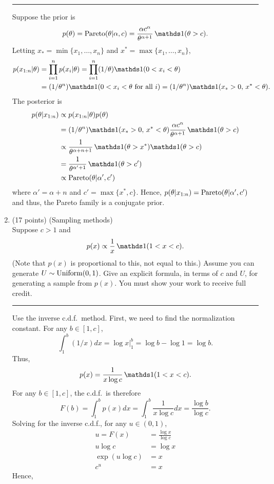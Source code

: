 \documentclass[12pt]{article}
\newcommand*\circled[1]{\tikz[baseline=(char.base)]{\node[shape=rectangle,draw,inner sep=2mm,rounded corners=2mm] (char) {#1};}}
\begin{document}
\begin{enumerate}
    \vspace{1em} \hrule
    Suppose the prior is
    $$p(\theta) = \Pareto(\theta|\alpha,c) = \frac{\alpha c^\alpha}{\theta^{\alpha+1}}\,\I(\theta>c).$$
    Letting $x_*=\min\{x_1,\ldots,x_n\}$ and $x^*=\max\{x_1,\ldots,x_n\}$,
    \begin{align*}
        p(x_{1:n}|\theta) &= \prod_{i=1}^n p(x_i|\theta) = \prod_{i=1}^n (1/\theta)\I(0<x_i<\theta) \\
                          &= (1/\theta^n)\I(0<x_i<\theta \text{ for all $i$}) = (1/\theta^n)\I(x_*>0,\,x^*<\theta).\\
    \end{align*}
    The posterior is 
    \begin{align*}
        p(\theta|x_{1:n}) &\propto p(x_{1:n}|\theta)p(\theta) \\
                          &= (1/\theta^n)\I(x_*>0,\,x^*<\theta) \frac{\alpha c^\alpha}{\theta^{\alpha+1}}\,\I(\theta>c)\\
                          &\propto \frac{1}{\theta^{\alpha+n+1}}\,\I(\theta>x^*)\I(\theta>c)\\
                          &= \frac{1}{\theta^{\alpha'+1}}\,\I(\theta>c')\\
                          &\propto \Pareto(\theta|\alpha',c')
    \end{align*}
    where $\alpha' = \alpha+n$ and $c' = \max\{x^*,c\}$. Hence,
    $p(\theta|x_{1:n}) = \operatorname*{Pareto}(\theta|\alpha',c')$
    and thus, the Pareto family is a conjugate prior.


    
\newpage
\item (17 points) (Sampling methods)\\
    Suppose $c>1$ and
    $$ p(x) \propto \frac{1}{x}\,\I(1<x<c). $$
    (Note that $p(x)$ is proportional to this, not equal to this.)
    Assume you can generate $U\sim\Uniform(0,1)$.  Give an explicit formula, in terms of $c$ and $U$, for generating a sample from $p(x)$.  You must show your work to receive full credit.

    \vspace{1em} \hrule
    Use the inverse c.d.f.\ method. First, we need to find the normalization constant. For any $b\in[1,c]$,
    $$ \int_1^b (1/x) d x = \log x \Big\vert_1^b = \log b - \log 1 = \log b.$$
    Thus, 
    $$ p(x) = \frac{1}{x \log c}\,\I(1<x<c). $$
    For any $b \in [1,c]$, the c.d.f.\  is therefore
    $$ F(b) = \int_1^b p(x) d x = \int_1^b \frac{1}{x \log c} d x = \frac{\log b}{\log c}. $$
    Solving for the inverse c.d.f., for any $u\in(0,1)$,
    \begin{align*}
        u = F(x) &= \frac{\log x}{\log c} \\
        u\log c &= \log x \\
        \exp(u\log c) &= x \\
        c^u &= x
    \end{align*}
    Hence, \circled{if $U\sim\Uniform(0,1)$, then $c^U\sim p(x)$.}




\end{enumerate}
\end{document}
